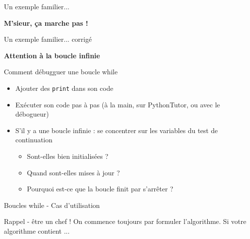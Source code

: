 \documentclass{beamer}
\begin{document}
	\begin{frame}[fragile]{Un exemple familier...}
				
	\pause
	\begin{center}
		\textbf{M'sieur, ça marche pas !}
	\end{center}
	\end{frame}
	\begin{frame}[fragile]{Un exemple familier... corrigé}
		
		\begin{center}
			\textbf{Attention à la boucle infinie}
		\end{center}
	\end{frame}
	\begin{frame}{Comment débugguer une boucle while}
		\begin{itemize}
			\item Ajouter des \texttt{print} dans son code
			\pause\item Exécuter son code pas à pas (à la main, sur PythonTutor, ou avec le débogueur)
			\pause\item S'il y a une boucle infinie : se concentrer sur les variables du test de continuation
				\begin{itemize}
					\item Sont-elles bien initialisées ?
					\item Quand sont-elles mises à jour ?
					\item Pourquoi est-ce que la boucle finit par s'arrêter ?
				\end{itemize}
		\end{itemize}
	\end{frame}
	\begin{frame}{Boucles while - Cas d'utilisation }
		\begin{block}{Rappel - être un chef !}
			\vspace{0 pt}
			On commence toujours par formuler l'algorithme. Si votre algorithme contient ...
		\end{block}


		\vfill

	\end{frame}
\end{document}
